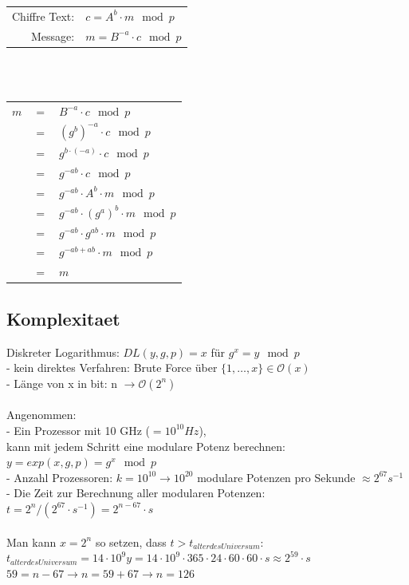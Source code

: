 \documentclass[
  a4paper,
  11pt,
]{article}
\begin{document}
\begin{center}

\begin{tabular}{rl}
	Chiffre Text:	&	$c=A^b\cdot m\mod p$\\
	Message:		&	$m=B^{-a}\cdot c\mod p$\\
\end{tabular}

\ \\ \ \\

\begin{tabular}{rcl}
	$m$		&	$=$ &	$B^{-a}\cdot c\mod p$\\
			&	$=$	&	$(g^b)^{-a}\cdot c\mod p$\\
			&	$=$	&	$g^{b\cdot (-a)}\cdot c\mod p$\\			
			&	$=$	&	$g^{-ab}\cdot c\mod p$\\
			&	$=$	&	$g^{-ab}\cdot A^b\cdot m\mod p$\\
			&	$=$	&	$g^{-ab}\cdot (g^a)^b\cdot m\mod p$\\
			&	$=$	&	$g^{-ab}\cdot g^{ab}\cdot m\mod p$\\
			&	$=$	&	$g^{-ab+ab}\cdot m\mod p$\\
			&	$=$	&	$m$\\
\end{tabular}
\end{center}

\subsection*{Komplexitaet}
\label{sub:Komplexitaet}

Diskreter Logarithmus: $DL(y, g, p) = x$ für $g^x=y\mod p$\\
- kein direktes Verfahren: Brute Force über $\{1, \ldots, x\}\in \mathcal O(x)$\\
- Länge von x in bit: n $\rightarrow \mathcal O(2^n)$\\\\

Angenommen:\\
- Ein Prozessor mit 10 GHz ($= 10^{10}Hz$),\\
kann mit jedem Schritt eine modulare Potenz berechnen: $y=exp(x,g,p)=g^x\mod p$\\
- Anzahl Prozessoren: $k=10^{10} \rightarrow 10^{20}$ modulare Potenzen pro Sekunde $\approx 2^{67} s^{-1}$\\
- Die Zeit zur Berechnung aller modularen Potenzen: $t=2^n/(2^{67}\cdot s^{-1})=2^{n-67}\cdot s$\\\\

Man kann $x=2^n$ so setzen, dass $t>t_{alter des Universum}$:\\
$t_{alter des Universum}=14\cdot 10^9y=14\cdot 10^9\cdot 365\cdot 24\cdot 60\cdot 60\cdot s\approx 2^{59}\cdot s$\\
$59=n-67\rightarrow n=59+67\rightarrow n=126$
\end{document}
